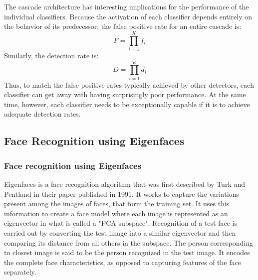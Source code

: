 \documentclass[%
        submission,
        notitlepage,
        narroweqnarray,
        inline,
        ]{ieee}
\begin{document}
The cascade architecture has interesting implications for the performance of the individual classifiers. Because the activation of each classifier depends entirely on the behavior of its predecessor, the false positive rate for an entire cascade is:
\begin{equation}
F = \prod _{i=1}^{K} f_i
\end{equation}
Similarly, the detection rate is:
\begin{equation}
D = \prod _{i=1}^{K} d_i
\end{equation}
Thus, to match the false positive rates typically achieved by other detectors, each classifier can get away with having surprisingly poor performance. At the same time, however, each classifier needs to be exceptionally capable if it is to achieve adequate detection rates.

\subsection{Face Recognition using Eigenfaces}

\subsubsection{Face recognition using Eigenfaces}
Eigenfaces is a face recognition algorithm that was first described by Turk and Pentland in their paper published in 1991. It works to capture the variations present among the images of faces, that form the training set. It uses this information to create a face model where each image is represented as an eigenvector in what is called a "PCA subspace". Recognition of a test face is carried out by converting the test image into a similar eigenvector and then comparing its distance from all others in the subspace. The person corresponding to closest image is said to be the person recognized in the test image. It encodes the complete face characteristics, as opposed to capturing features of the face separately.\\
\end{document}
